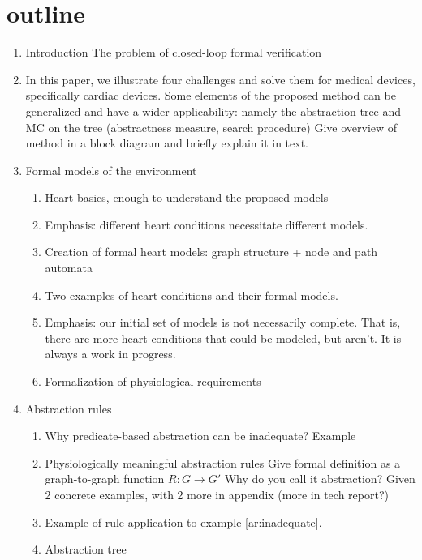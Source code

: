 \section{outline}
\begin{enumerate}
	\item Introduction
	\subitem The problem of closed-loop formal verification
	\item In this paper, we illustrate four challenges and solve them for medical devices, specifically cardiac devices.
	\subitem Some elements of the proposed method can be generalized and have a wider applicability: namely the abstraction tree and MC on the tree (abstractness measure, search procedure)
	\subitem Give overview of method in a block diagram and briefly explain it in text.
	
	\item Formal models of the environment
	\begin{enumerate}
		\item Heart basics, enough to understand the proposed models
		\item Emphasis: different heart conditions necessitate different models.
		\item Creation of formal heart models: graph structure + node and path automata
		\item Two examples of heart conditions and their formal models.
		\item Emphasis: our initial set of models is not necessarily complete. That is, there are more heart conditions that could be modeled, but aren't. It is always a work in progress.		
		\item Formalization of physiological requirements
	\end{enumerate}
	
	\item Abstraction rules
	\begin{enumerate}
		\item Why predicate-based abstraction can be inadequate? Example
		\label{ar:inadequate}
		\item Physiologically meaningful abstraction rules
		\subitem Give formal definition as a graph-to-graph function $R: G \rightarrow G'$ 
		\subitem Why do you call it abstraction? 
		\subitem Given 2 concrete examples, with 2 more in appendix (more in tech report?)
		\item Example of rule application to example \ref{ar:inadequate}.
		\item Abstraction tree		
	\end{enumerate}
	

\end{enumerate}
